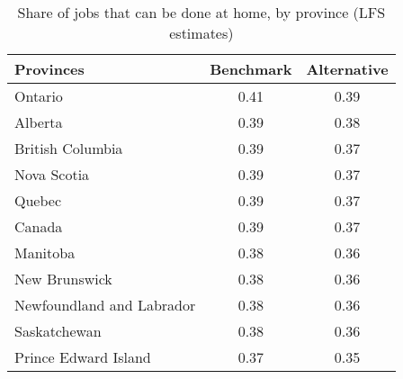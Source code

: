 \begin{table}[ht]
\centering
\caption{Share of jobs that can be done at home, by province (LFS estimates)} 
\label{tab:provinces_lfs}
\begin{tabular}{lcc}
  \hline
Provinces & Benchmark & Alternative \\ 
  \hline
Ontario & 0.41 & 0.39 \\ 
  Alberta & 0.39 & 0.38 \\ 
  British Columbia & 0.39 & 0.37 \\ 
  Nova Scotia & 0.39 & 0.37 \\ 
  Quebec & 0.39 & 0.37 \\ 
  Canada & 0.39 & 0.37 \\ 
  Manitoba & 0.38 & 0.36 \\ 
  New Brunswick & 0.38 & 0.36 \\ 
  Newfoundland and Labrador & 0.38 & 0.36 \\ 
  Saskatchewan & 0.38 & 0.36 \\ 
  Prince Edward Island & 0.37 & 0.35 \\ 
   \hline
\end{tabular}
\end{table}
